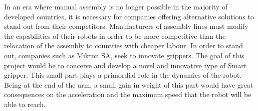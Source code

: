 %
%
In an era where manual assembly is no longer possible in the majority of developed countries, it is necessary for companies offering alternative solutions to stand out from their competitors. Manufacturers of assembly lines must modify the capabilities of their robots in order to be more competitive than the relocation of the assembly to countries with cheaper labour. In order to stand out, companies such as Mikron SA, seek to innovate grippers. The goal of this project would be to conceive and develop a novel and innovative type of Smart gripper. This small part plays a primordial role in the dynamics of the robot. Being at the end of the arm, a small gain in weight of this part would have great consequences on the acceleration and the maximum speed that the robot will be able to reach.

